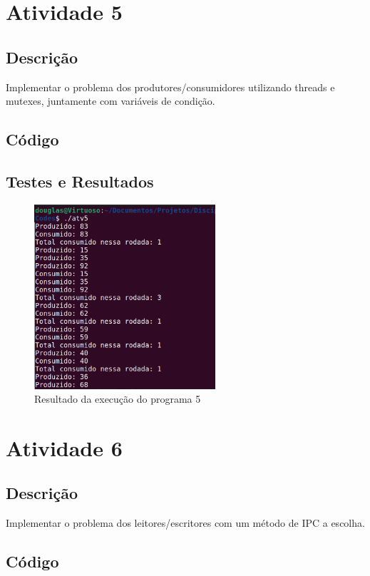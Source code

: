 \documentclass{article}
\begin{document}
\newpage

\section{Atividade 5}
\subsection{Descrição}
Implementar o problema dos produtores/consumidores utilizando threads e mutexes, juntamente com variáveis de condição.
\subsection{Código}

\subsection{Testes e Resultados}
\begin{figure}[ht]
    \centering
    \includegraphics[width=0.6\textwidth]{./Images/atv5_result.png}
    \caption{Resultado da execução do programa 5}
    \label{fig:atv5}
\end{figure}

\section{Atividade 6}
\subsection{Descrição}
Implementar o problema dos leitores/escritores com um método de IPC a escolha.
\subsection{Código}

\end{document}
